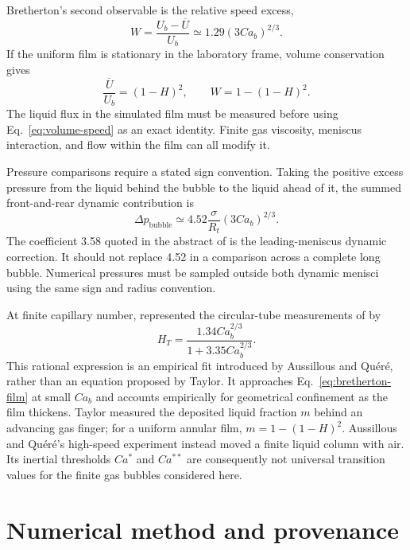\documentclass[11pt,a4paper]{article}
\begin{document}
Bretherton's second observable is the relative speed excess,
\begin{equation}
  W=\frac{U_b-\overline U}{U_b}
    \simeq1.29(3Ca_b)^{2/3}.
  \label{eq:speed-excess}
\end{equation}
If the uniform film is stationary in the laboratory frame, volume
conservation gives
\begin{equation}
  \frac{\overline U}{U_b}=(1-H)^2,
  \qquad W=1-(1-H)^2.
  \label{eq:volume-speed}
\end{equation}
The liquid flux in the simulated film must be measured before using
Eq.~\eqref{eq:volume-speed} as an exact identity. Finite gas viscosity,
meniscus interaction, and flow within the film can all modify it.

Pressure comparisons require a stated sign convention. Taking the positive
excess pressure from the liquid behind the bubble to the liquid ahead of it,
the summed front-and-rear dynamic contribution is
\begin{equation}
  \Delta p_{\mathrm{bubble}}
  \simeq4.52\frac{\sigma}{R_t}(3Ca_b)^{2/3}.
  \label{eq:pressure-drop}
\end{equation}
The coefficient 3.58 quoted in the abstract of
\citet{bretherton1961motion} is the leading-meniscus dynamic correction. It
should not replace 4.52 in a comparison across a complete long bubble.
Numerical pressures must be sampled outside both dynamic menisci using the
same sign and radius convention.

At finite capillary number, \citet{aussillous2000quick} represented the
circular-tube measurements of \citet{taylor1961deposition} by
\begin{equation}
  H_T=\frac{1.34Ca_b^{2/3}}{1+3.35Ca_b^{2/3}}.
  \label{eq:aq-correlation}
\end{equation}
This rational expression is an empirical fit introduced by Aussillous and
Qu\'er\'e, rather than an equation proposed by Taylor. It approaches
Eq.~\eqref{eq:bretherton-film} at small $Ca_b$ and accounts empirically for
geometrical confinement as the film thickens. Taylor measured the deposited
liquid fraction $m$ behind an advancing gas finger; for a uniform annular film,
$m=1-(1-H)^2$. Aussillous and Qu\'er\'e's high-speed experiment instead moved
a finite liquid column with air. Its inertial thresholds $Ca^*$ and $Ca^{**}$
are consequently not universal transition values for the finite gas bubbles
considered here.

\section{Numerical method and provenance}
\end{document}
